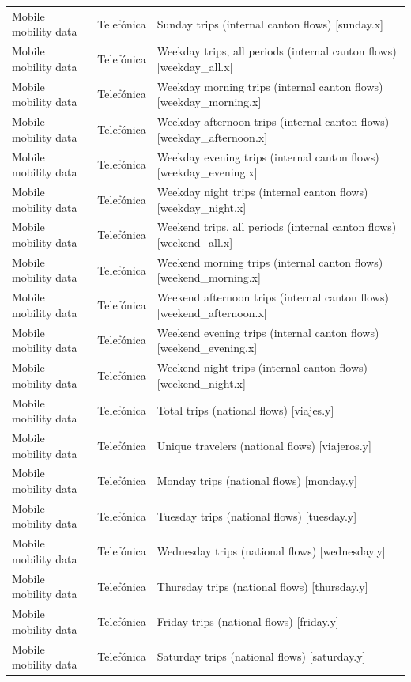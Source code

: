 \documentclass[10pt,a4paper]{article}
\begin{document}
\begin{longtable}{@{}>{\raggedright\arraybackslash}p{3.5cm}>{\raggedright\arraybackslash}p{5.6cm}>{\raggedright\arraybackslash}p{\dimexpr\textwidth-9.1cm-4\tabcolsep\relax}@{}}
Mobile mobility data & Telef\'{o}nica & Sunday trips (internal canton flows) [sunday.x]\\
Mobile mobility data & Telef\'{o}nica & Weekday trips, all periods (internal canton flows) [weekday\_all.x]\\
Mobile mobility data & Telef\'{o}nica & Weekday morning trips (internal canton flows) [weekday\_morning.x]\\
Mobile mobility data & Telef\'{o}nica & Weekday afternoon trips (internal canton flows) [weekday\_afternoon.x]\\
Mobile mobility data & Telef\'{o}nica & Weekday evening trips (internal canton flows) [weekday\_evening.x]\\
Mobile mobility data & Telef\'{o}nica & Weekday night trips (internal canton flows) [weekday\_night.x]\\
Mobile mobility data & Telef\'{o}nica & Weekend trips, all periods (internal canton flows) [weekend\_all.x]\\
Mobile mobility data & Telef\'{o}nica & Weekend morning trips (internal canton flows) [weekend\_morning.x]\\
Mobile mobility data & Telef\'{o}nica & Weekend afternoon trips (internal canton flows) [weekend\_afternoon.x]\\
Mobile mobility data & Telef\'{o}nica & Weekend evening trips (internal canton flows) [weekend\_evening.x]\\
Mobile mobility data & Telef\'{o}nica & Weekend night trips (internal canton flows) [weekend\_night.x]\\
Mobile mobility data & Telef\'{o}nica & Total trips (national flows) [viajes.y]\\
Mobile mobility data & Telef\'{o}nica & Unique travelers (national flows) [viajeros.y]\\
Mobile mobility data & Telef\'{o}nica & Monday trips (national flows) [monday.y]\\
Mobile mobility data & Telef\'{o}nica & Tuesday trips (national flows) [tuesday.y]\\
Mobile mobility data & Telef\'{o}nica & Wednesday trips (national flows) [wednesday.y]\\
Mobile mobility data & Telef\'{o}nica & Thursday trips (national flows) [thursday.y]\\
Mobile mobility data & Telef\'{o}nica & Friday trips (national flows) [friday.y]\\
Mobile mobility data & Telef\'{o}nica & Saturday trips (national flows) [saturday.y]\\

\end{longtable}
\end{document}
